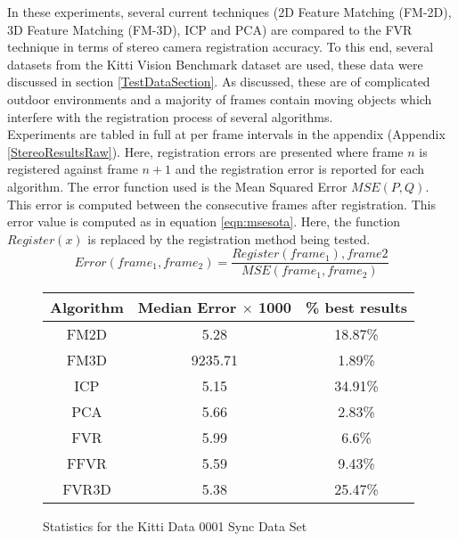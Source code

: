 
In these experiments, several current techniques (2D Feature Matching (FM-2D), 3D Feature Matching (FM-3D), ICP and PCA) are compared to the FVR technique in terms of stereo camera registration accuracy. To this end, several datasets from the Kitti Vision Benchmark dataset are used, these data were discussed in section \ref{TestDataSection}. As discussed, these are of complicated outdoor environments and a majority of frames contain moving objects which interfere with the registration process of several algorithms. \\

Experiments are tabled in full at per frame intervals in the appendix (Appendix \ref{StereoResultsRaw}). Here, registration errors are presented where frame $n$ is registered against frame $n+1$ and the registration error is reported for each algorithm. The error function used is the Mean Squared Error $MSE(P,Q)$. This error is computed between the consecutive frames after registration. This error value is computed as in equation \ref{eqn:msesota}. Here, the function $Register(x)$ is replaced by the registration method being tested. \\

\begin{equation} \label{eqn:msesota}
Error(frame_1, frame_2) =  \frac{Register(frame_1), frame2}{MSE(frame_1,frame_2)}
\end{equation}



\begin{figure}
\centering
\begin{tabular}{ccc}
\hline
\textbf{Algorithm} & \textbf{Median Error $\times$ 1000} & \textbf{\% best results}\\ \hline
FM2D	& 5.28 & 18.87\%\\
FM3D	& 9235.71 & 1.89\%\\
ICP	& 5.15 & 34.91\%\\
PCA	& 5.66 & 2.83\%\\
FVR	& 5.99 & 6.6\%\\
FFVR	& 5.59 & 9.43\%\\
FVR3D	& 5.38 & 25.47\%\\
\end{tabular}
\caption{Statistics for the Kitti Data 0001 Sync Data Set}
\label{tab:kittidata0001sync}
\end{figure} 

